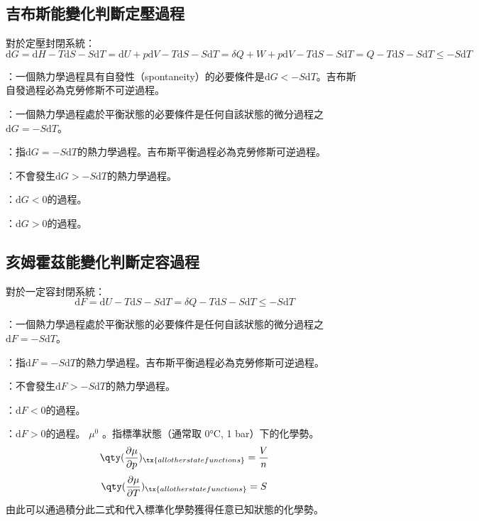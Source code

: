 \documentclass[a4paper,12pt]{report}
\begin{document}
\subsection{吉布斯能變化判斷定壓過程}
對於定壓封閉系統：
\[\mathrm{d} G = \mathrm{d} H - T \mathrm{d} S - S\mathrm{d} T = \mathrm{d} U + p\mathrm{d} V - T \mathrm{d} S - S\mathrm{d} T = \delta Q + W + p\mathrm{d} V - T \mathrm{d} S - S\mathrm{d} T = Q - T \mathrm{d} S - S\mathrm{d} T \leq - S\mathrm{d} T\]
\bit
\item {}：一個熱力學過程具有自發性（spontaneity）的必要條件是$\mathrm{d} G < - S\mathrm{d} T$。吉布斯自發過程必為克勞修斯不可逆過程。
\item {}：一個熱力學過程處於平衡狀態的必要條件是任何自該狀態的微分過程之$\mathrm{d} G = - S\mathrm{d} T$。
\item {}：指$\mathrm{d} G = - S\mathrm{d} T$的熱力學過程。吉布斯平衡過程必為克勞修斯可逆過程。
\item {}：不會發生$\mathrm{d} G > - S\mathrm{d} T$的熱力學過程。
\item {}：$\mathrm{d}G<0$的過程。
\item {}：$\mathrm{d}G>0$的過程。
\eit
\subsection{亥姆霍茲能變化判斷定容過程}
對於一定容封閉系統：
\[\mathrm{d} F = \mathrm{d} U - T \mathrm{d} S - S\mathrm{d} T = \delta Q - T \mathrm{d} S - S\mathrm{d} T\leq - S\mathrm{d} T\]
\bit
\item {}：一個熱力學過程處於平衡狀態的必要條件是任何自該狀態的微分過程之$\mathrm{d} F  = - S\mathrm{d} T$。
\item {}：指$\mathrm{d} F = - S\mathrm{d} T$的熱力學過程。吉布斯平衡過程必為克勞修斯可逆過程。
\item {}：不會發生$\mathrm{d} F > - S\mathrm{d} T$的熱力學過程。
\item {}：$\mathrm{d}F<0$的過程。
\item {}：$\mathrm{d}F>0$的過程。
\eit
{}
\(\mu^0\) 。指標準狀態（通常取 0°C, 1 bar）下的化學勢。
\[\qty(\frac{\partial\mu}{\partial p})_{\tx{all other state functions}}=\frac{V}{n}\]
\[\qty(\frac{\partial\mu}{\partial T})_{\tx{all other state functions}}=S\]
由此可以通過積分此二式和代入標準化學勢獲得任意已知狀態的化學勢。
\end{document}
